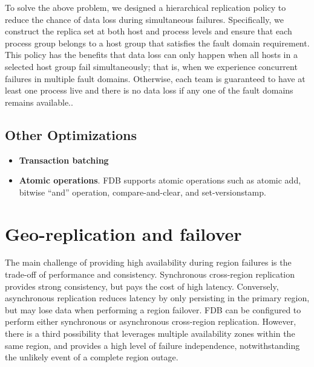 \documentclass[11pt]{article}
\begin{document}
To solve the above problem, we designed a hierarchical replication policy to reduce the chance of data
loss during simultaneous failures. Specifically, we construct the replica set at both host and process
levels and ensure that each process group belongs to a host group that satisfies the fault domain
requirement. This policy has the benefits that data loss can only happen when all hosts in a selected
host group fail simultaneously; that is, when we experience concurrent failures in multiple fault
domains. Otherwise, each team is guaranteed to have at least one process live and there is no data
loss if any one of the fault domains remains available..
\subsection{Other Optimizations}
\label{sec:org5878f0d}
\begin{itemize}
\item \textbf{Transaction batching}
\item \textbf{Atomic operations}. FDB supports atomic operations such as atomic add, bitwise “and” operation,
compare-and-clear, and set-versionstamp.
\end{itemize}
\section{Geo-replication and failover}
\label{sec:org14e5b31}
The main challenge of providing high availability during region failures is the trade-off of
performance and consistency. Synchronous cross-region replication provides strong consistency, but
pays the cost of high latency. Conversely, asynchronous replication reduces latency by only persisting
in the primary region, but may lose data when performing a region failover. FDB can be configured to
perform either synchronous or asynchronous cross-region replication. However, there is a third
possibility that leverages multiple availability zones within the same region, and provides a high
level of failure independence, notwithstanding the unlikely event of a complete region outage.
\end{document}
